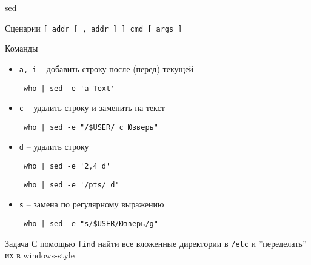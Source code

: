 \begin{frame}[fragile]{sed}
	\begin{block}{Сценарии}
		{\tt [ addr [ ,  addr ] ] cmd [ args ]}
	\end{block}

	\tiny
	\begin{block}{Команды}
		\begin{itemize}
		  \item {\tt a, i} -- добавить строку после (перед) текущей
			  \begin{verbatim} who | sed -e 'a Text' \end{verbatim}
		  \item {\tt c} -- удалить строку и заменить на текст
			  \begin{verbatim} who | sed -e "/$USER/ c Юзверь" \end{verbatim}
		  \item {\tt d} -- удалить строку
			  \begin{verbatim} who | sed -e '2,4 d' \end{verbatim}
			  \begin{verbatim} who | sed -e '/pts/ d' \end{verbatim}
		  \item {\tt s} -- замена по регулярному выражению
			  \begin{verbatim} who | sed -e "s/$USER/Юзверь/g" \end{verbatim}
		\end{itemize}
	\end{block}
	\pause
	\begin{block}{Задача}
		С помощью {\tt find} найти все вложенные директории в {\tt /etc} и 
		''переделать'' их в windows-style
	\end{block}
\end{frame}
